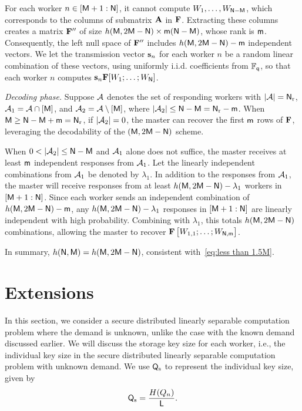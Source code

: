\documentclass[conference,letterpaper]{IEEEtran}
\begin{document}
For each worker $n \in [{\sf M}+1 : {\sf N}]$, it cannot compute $W_1, \ldots, W_{{\sf N} - {\sf M}}$, which corresponds to the columns of submatrix ${\bf A}$ in ${\bf F}$. Extracting these columns creates a matrix ${\bf F}''$ of size $h({\sf M}, 2{\sf M} - {\sf N}) \times {\sf m} ({\sf N} - {\sf M})$, whose rank is ${\sf m}$. Consequently, the left null space of ${\bf F}''$ includes $h({\sf M}, 2{\sf M} - {\sf N}) - {\sf m}$ independent vectors. We let the transmission vector ${\bf s}_n$ for each worker $n$ be a random linear combination of these vectors, using uniformly i.i.d. coefficients from $\mathbb{F}_{{\sf q}}$, so that each worker $n$ computes ${\bf s}_n {\bf F} [W_1; \ldots; W_{{\sf N}}]$.

{\it Decoding phase.} Suppose ${\cal A}$ denotes the set of responding workers with $|{\cal A}| = {\sf N}_{\rm r}$, ${\cal A}_1 = {\cal A} \cap [{\sf M}]$, and ${\cal A}_2 = {\cal A} \setminus [{\sf M}]$, where $|{\cal A}_2| \leq {\sf N} - {\sf M} = {\sf N}_{\rm r} - {\sf m}$. When ${\sf M} \geq {\sf N} - {\sf M} + {\sf m} = {\sf N}_{\rm r}$, if $|{\cal A}_2| = 0$, the master can recover the first ${\sf m}$ rows of ${\bf F}$, leveraging the decodability of the $({\sf M}, 2{\sf M} - {\sf N})$ scheme.

When $0 < |{\cal A}_2| \leq {\sf N} - {\sf M}$ and ${\cal A}_1$ alone does not suffice, the master receives at least ${\sf m}$ independent responses from ${\cal A}_1$. Let the linearly independent combinations from ${\cal A}_1$ be denoted by $\lambda_1$. In addition to the responses from ${\cal A}_1$, the master will receive responses from at least $h({\sf M}, 2{\sf M} - {\sf N}) - \lambda_1$ workers in $[{\sf M}+1 : {\sf N}]$. Since each worker sends an independent combination of $h({\sf M}, 2{\sf M} - {\sf N}) - {\sf m}$, any $h({\sf M}, 2{\sf M} - {\sf N}) - \lambda_1$ responses in $[{\sf M}+1 : {\sf N}]$ are linearly independent with high probability. Combining with $\lambda_1$, this totals $h({\sf M}, 2{\sf M} - {\sf N})$ combinations, allowing the master to recover ${\bf F} \begin{bmatrix} W_{1,1}; \ldots; W_{{\sf N}, {\sf m}} \end{bmatrix}$.

In summary, $h({\sf N}, {\sf M}) = h({\sf M}, 2{\sf M} - {\sf N})$, consistent with~\eqref{eq:less than 1.5M}.



\section{Extensions}
In this section, we consider a secure distributed linearly separable computation problem where the demand is unknown, unlike the case with the known demand discussed earlier. We will discuss the storage key size for each worker, i.e., the individual key size in the secure distributed linearly separable computation problem with unknown demand.
We use \( {\sf Q}_{\rm s} \) to represent the individual key size, given by
\begin{align}
{\sf Q}_{\rm s} = \frac{H( Q_n )}{{\sf L}}. \label{eq:def of Qs}
\end{align}
\end{document}
